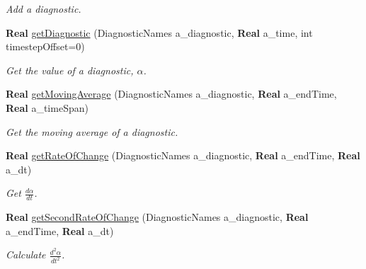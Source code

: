 \begin{DoxyCompactItemize}
\begin{DoxyCompactList}\small\item\em Add a diagnostic. \end{DoxyCompactList}\item 
\mbox{\label{class_diagnostics_a0850970e8da4c5a49ab6f910394c2f70}} 
\textbf{ Real} \hyperlink{class_diagnostics_a0850970e8da4c5a49ab6f910394c2f70}{get\+Diagnostic} (Diagnostic\+Names a\+\_\+diagnostic, \textbf{ Real} a\+\_\+time, int timestep\+Offset=0)
\begin{DoxyCompactList}\small\item\em Get the value of a diagnostic, $ \alpha $. \end{DoxyCompactList}\item 
\mbox{\label{class_diagnostics_a84efdaf23bbbfd669e8687d472dd2e96}} 
\textbf{ Real} \hyperlink{class_diagnostics_a84efdaf23bbbfd669e8687d472dd2e96}{get\+Moving\+Average} (Diagnostic\+Names a\+\_\+diagnostic, \textbf{ Real} a\+\_\+end\+Time, \textbf{ Real} a\+\_\+time\+Span)
\begin{DoxyCompactList}\small\item\em Get the moving average of a diagnostic. \end{DoxyCompactList}\item 
\mbox{\label{class_diagnostics_af58ac3b481dd163c6d6951e93bbc3af1}} 
\textbf{ Real} \hyperlink{class_diagnostics_af58ac3b481dd163c6d6951e93bbc3af1}{get\+Rate\+Of\+Change} (Diagnostic\+Names a\+\_\+diagnostic, \textbf{ Real} a\+\_\+end\+Time, \textbf{ Real} a\+\_\+dt)
\begin{DoxyCompactList}\small\item\em Get $ \frac{d \alpha}{d t} $. \end{DoxyCompactList}\item 
\mbox{\label{class_diagnostics_af961972446faba22b43276eeafcadfaf}} 
\textbf{ Real} \hyperlink{class_diagnostics_af961972446faba22b43276eeafcadfaf}{get\+Second\+Rate\+Of\+Change} (Diagnostic\+Names a\+\_\+diagnostic, \textbf{ Real} a\+\_\+end\+Time, \textbf{ Real} a\+\_\+dt)
\begin{DoxyCompactList}\small\item\em Calculate $ \frac{d^2 \alpha}{dt^2} $. \end{DoxyCompactList}\item 

\end{DoxyCompactItemize}
